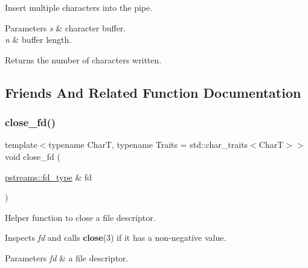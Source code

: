 Insert multiple characters into the pipe. 


\begin{DoxyParams}{Parameters}
{\em s} & character buffer. \\
\hline
{\em n} & buffer length. \\
\hline
\end{DoxyParams}
\begin{DoxyReturn}{Returns}
the number of characters written. 
\end{DoxyReturn}


\subsection{Friends And Related Function Documentation}
\mbox{\label{classredi_1_1basic__pstreambuf_a1f07c96f98013de48578043f0caa0e82}} 
\subsubsection{\texorpdfstring{close\+\_\+fd()}{close\_fd()}}
{\footnotesize\ttfamily template$<$typename CharT, typename Traits = std\+::char\+\_\+traits$<$\+Char\+T$>$$>$ \\
void close\+\_\+fd (\begin{DoxyParamCaption}\item[{\mbox{\hyperlink{structredi_1_1pstreams_add0b7eaed16eb6c22a56012958d85b1d}{pstreams\+::fd\+\_\+type}} \&}]{fd }\end{DoxyParamCaption})\hspace{0.3cm}{\ttfamily [related]}}



Helper function to close a file descriptor. 

Inspects {\itshape fd} and calls {\bfseries close}(3) if it has a non-\/negative value.


\begin{DoxyParams}{Parameters}
{\em fd} & a file descriptor. \\
\hline
\end{DoxyParams}
\mbox{\label{classredi_1_1basic__pstreambuf_a8b7a0d3e1009028f3f6af0fe96a9743e}} 
